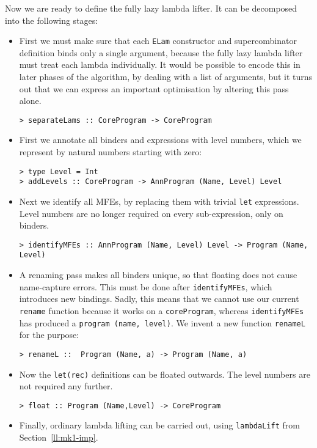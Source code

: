 Now we are ready to define the fully lazy lambda lifter.  It can be
decomposed into the following stages:
\begin{itemize}
\item
First we must make sure that each \mbox{\tt ELam} constructor and supercombinator
definition binds only a
single argument, because the fully lazy lambda lifter must treat each
lambda individually.  It would be possible to encode this in later
phases of the algorithm, by dealing with a list of arguments, but it
turns out that we can express an important optimisation by altering
this pass alone.
\begin{verbatim}
> separateLams :: CoreProgram -> CoreProgram
\end{verbatim}
%
\item
First we annotate all binders and expressions with level numbers,
which we represent by natural numbers starting with zero:
\begin{verbatim}
> type Level = Int
> addLevels :: CoreProgram -> AnnProgram (Name, Level) Level
\end{verbatim}
%
%
\item
Next we identify all MFEs, by replacing them with trivial
\mbox{\tt let} expressions.  Level numbers are no longer required on every
sub-expression, only on binders.
\begin{verbatim}
> identifyMFEs :: AnnProgram (Name, Level) Level -> Program (Name, Level)
\end{verbatim}
%
\item
A renaming pass makes all binders unique, so that floating does not
cause name-capture errors.  This must be done after \mbox{\tt identifyMFEs},
which introduces new bindings.  Sadly, this means that we cannot
use our current \mbox{\tt rename} function because it works on a \mbox{\tt coreProgram},
whereas \mbox{\tt identifyMFEs} has produced a \mbox{\tt program\ (name,\ level)}.
We invent a new function \mbox{\tt renameL} for the purpose:
\begin{verbatim}
> renameL ::  Program (Name, a) -> Program (Name, a)
\end{verbatim}
%
\item
Now the \mbox{\tt let(rec)} definitions can be floated outwards.  The level
numbers are not required any further.
\begin{verbatim}
> float :: Program (Name,Level) -> CoreProgram
\end{verbatim}
%
\par
\item
Finally, ordinary lambda lifting can be carried out, using
\mbox{\tt lambdaLift} from Section~\ref{ll:mk1-imp}.

\end{itemize}
